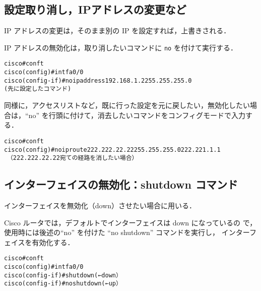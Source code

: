 \subsection*{設定取り消し，IPアドレスの変更など}
IP アドレスの変更は，そのまま別の IP を設定すれば，上書きされる．

IP アドレスの無効化は，取り消したいコマンドに \texttt{no} を付けて実行する．

\begin{center}
\begin{screen}
\begin{alltt}
cisco#conf t
cisco(config)#int fa0/0
cisco(config-if)#no ip address 192.168.1.2 255.255.255.0
                    (先に設定したコマンド)
\end{alltt}
\end{screen}
\end{center}

同様に，アクセスリストなど，既に行った設定を元に戻したい，無効化したい場合は，``no'' を行頭に付けて，消去したいコマンドをコンフィグモードで入力する．

\begin{center}
\begin{screen}
\begin{alltt}
cisco#conf t
cisco(config)#no ip route 222.222.22.22 255.255.255.0 222.221.1.1
　（222.222.22.22 宛ての経路を消したい場合）
\end{alltt}
\end{screen}
\end{center}


\subsection*{インターフェイスの無効化：shutdown コマンド}
インターフェイスを無効化（down）させたい場合に用いる．

Cisco ルータでは，デフォルトでインターフェイスは down になっているの
で，使用時には後述の``no'' を付けた ``no shutdown'' コマンドを実行し，
インターフェイスを有効化する．

\begin{center}
\begin{screen}
\begin{alltt}
cisco#conf t
cisco(config)#int fa0/0
cisco(config-if)#shutdown         ( ← down）
cisco(config-if)#no shutdown      ( ← up）
\end{alltt}
\end{screen}
\end{center}

